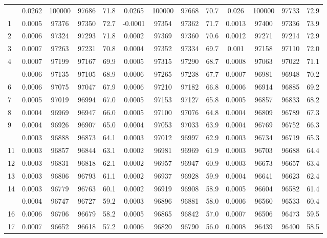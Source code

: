 \documentclass[
  14pt,
]{article}
\begin{document}
\begin{longtable}[t]{lcccccccccccc}
\endfoot
\bottomrule
\endlastfoot
0 & 0.0262 & 100000 & 97686 & 71.8 & 0.0265 & 100000 & 97668 & 70.7 & 0.026 & 100000 & 97733 & 72.9\\
1 & 0.0005 & 97376 & 97350 & 72.7 & -0.0001 & 97354 & 97362 & 71.7 & 0.0013 & 97400 & 97336 & 73.9\\
2 & 0.0006 & 97324 & 97293 & 71.8 & 0.0002 & 97369 & 97360 & 70.6 & 0.0012 & 97271 & 97214 & 72.9\\
3 & 0.0007 & 97263 & 97231 & 70.8 & 0.0004 & 97352 & 97334 & 69.7 & 0.001 & 97158 & 97110 & 72.0\\
4 & 0.0007 & 97199 & 97167 & 69.9 & 0.0005 & 97315 & 97290 & 68.7 & 0.0008 & 97063 & 97022 & 71.1\\
\addlinespace
5 & 0.0006 & 97135 & 97105 & 68.9 & 0.0006 & 97265 & 97238 & 67.7 & 0.0007 & 96981 & 96948 & 70.2\\
6 & 0.0006 & 97075 & 97047 & 67.9 & 0.0006 & 97210 & 97182 & 66.8 & 0.0006 & 96914 & 96885 & 69.2\\
7 & 0.0005 & 97019 & 96994 & 67.0 & 0.0005 & 97153 & 97127 & 65.8 & 0.0005 & 96857 & 96833 & 68.2\\
8 & 0.0004 & 96969 & 96947 & 66.0 & 0.0005 & 97100 & 97076 & 64.8 & 0.0004 & 96809 & 96789 & 67.3\\
9 & 0.0004 & 96926 & 96907 & 65.0 & 0.0004 & 97053 & 97033 & 63.9 & 0.0004 & 96769 & 96752 & 66.3\\
\addlinespace
10 & 0.0003 & 96888 & 96873 & 64.1 & 0.0003 & 97012 & 96997 & 62.9 & 0.0003 & 96734 & 96719 & 65.3\\
11 & 0.0003 & 96857 & 96844 & 63.1 & 0.0002 & 96981 & 96969 & 61.9 & 0.0003 & 96703 & 96688 & 64.4\\
12 & 0.0003 & 96831 & 96818 & 62.1 & 0.0002 & 96957 & 96947 & 60.9 & 0.0003 & 96673 & 96657 & 63.4\\
13 & 0.0003 & 96806 & 96793 & 61.1 & 0.0002 & 96937 & 96928 & 59.9 & 0.0004 & 96641 & 96623 & 62.4\\
14 & 0.0003 & 96779 & 96763 & 60.1 & 0.0002 & 96919 & 96908 & 58.9 & 0.0005 & 96604 & 96582 & 61.4\\
\addlinespace
15 & 0.0004 & 96747 & 96727 & 59.2 & 0.0003 & 96896 & 96881 & 58.0 & 0.0006 & 96560 & 96533 & 60.4\\
16 & 0.0006 & 96706 & 96679 & 58.2 & 0.0005 & 96865 & 96842 & 57.0 & 0.0007 & 96506 & 96473 & 59.5\\
17 & 0.0007 & 96652 & 96618 & 57.2 & 0.0006 & 96820 & 96790 & 56.0 & 0.0008 & 96439 & 96400 & 58.5\\

\end{longtable}
\end{document}
